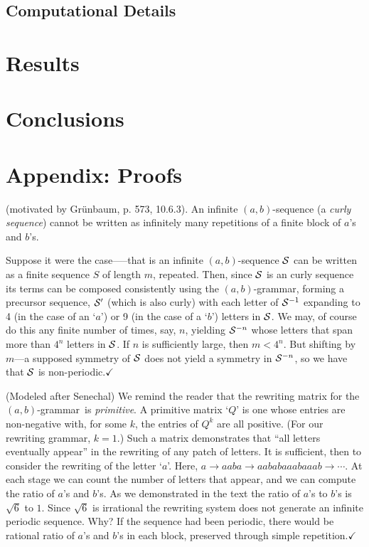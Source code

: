 \documentclass[11pt]{article}
\def\emph#1{{\em #1\/}}
\def\term#1{\emph{#1}}
\newcounter{thm}
\def\QED{$\checkmark$}
\def\ni{\noindent}
\def\ab{$(a,b)$}
\def\abg{\ab-grammar}
\def\q#1{`$#1$'}
\begin{document}
\subsection{Computational Details}
\section{Results}\label{sect:results}
\section{Conclusions}\label{sect:conclusions}
\section*{Appendix: Proofs}\label{app:proofs}

\ni{\bf Proof of Theorem~\ref{thm:aperiodic}.} (motivated by Gr\"unbaum, p. 573, 10.6.3).
An infinite \ab-sequence (a \term{curly sequence}) cannot be written as infinitely many repetitions of
a finite block of $a$'s and $b$'s.

Suppose it were the case—--that is an infinite \ab-sequence $\mathcal{S}$ can be
written as a finite sequence $S$ of length $m$, repeated.  Then, since $\mathcal{S}$
is an curly sequence its terms can be composed consistently using the
\abg, forming a precursor sequence, $\mathcal{S}'$ (which is also curly) with
each letter of $\mathcal{S}^{-1}$ expanding to 4 (in the case of an \q{a}) or 9 (in the
case of a \q{b}) letters in $\mathcal{S}$.  We may, of course do this any finite number
of times, say, $n$, yielding $\mathcal{S}^{-n}$ whose letters that span more than
$4^n$ letters in $\mathcal{S}$.  If $n$ is sufficiently large, then $m < 4^n$.  But
shifting by $m$---a supposed symmetry of $\mathcal{S}$ does not yield a symmetry in
$\mathcal{S}^{-n}$, so we have that $\mathcal{S}$ is non-periodic.\QED

\ni{\bf Alternative proof.}(Modeled after Senechal\cite{Se95})  
We remind the reader that the
rewriting matrix for the \abg\ is \term{primitive}.  A primitive matrix
\q{Q} is one whose entries are non-negative with, for some $k$, the entries of
$Q^k$ are all positive. (For our rewriting grammar, $k=1$.)  Such a matrix
demonstrates that ``all letters eventually appear'' in the rewriting of any
patch of letters.  It is sufficient, then to consider the rewriting of the
letter \q{a}.  Here, $a\rightarrow aaba \rightarrow aababaaabaaab \rightarrow \cdots$.  At each stage we can count the number of letters that
appear, and we can compute the ratio of $a$'s and $b$'s.  As we demonstrated
in the text the ratio of $a$'s to $b$'s is $\sqrt{6}$ to $1$.  Since
$\sqrt{6}$ is irrational the rewriting system does not generate an infinite
periodic sequence.  Why? If the sequence had been periodic, there would be
rational ratio of $a$'s and $b$'s in each block, preserved through simple
repetition.\QED
\end{document}
